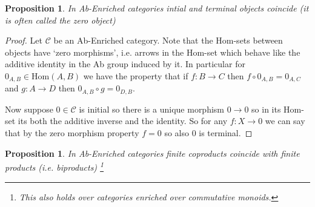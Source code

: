 \documentclass[12pt]{article}
\numberwithin{equation}{section}
\newcommand{\Hom}{{\mathrm{Hom}}}
\newcounter{dummy} \numberwithin{dummy}{section}
\newtheorem{proposition}[dummy]{Proposition}
\begin{document}
	\begin{proposition}
		In Ab-Enriched categories intial and terminal objects coincide (it is often called the zero object)
	\end{proposition}
	\begin{proof}
		Let $\mathcal{C}$ be an Ab-Enriched category. Note that the Hom-sets between objects have `zero morphisms', i.e. arrows in the Hom-set which behave like the additive identity in the Ab group induced by it. In particular for $0_{A,B}\in \Hom(A,B)$ we have the property that if $f:B \to C$ then $f\circ 0_{A,B}=0_{A,C}$ and $g: A \to D$ then $0_{A,B}\circ g=0_{D,B}$.
		
		Now suppose $0 \in \mathcal{C}$ is initial so there is a unique morphism $0\to 0$ so in its Hom-set its both the additive inverse and the identity. So for any $f:X \to 0$ we can say that by the zero morphism property $f=0$ so also $0$ is terminal.
	\end{proof}
	\begin{proposition}
		In Ab-Enriched categories finite coproducts coincide with finite products (i.e. biproducts) \footnote{This also holds over categories enriched over commutative monoids.}
	\end{proposition}
\end{document}

